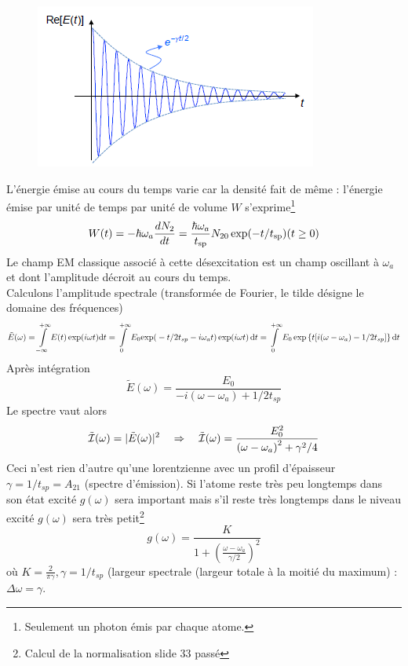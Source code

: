 	\newpage
		\begin{figure}
	\vspace{-5mm}
	\includegraphics[scale=0.75]{ch2/image17.png}
	\end{figure}
	L'énergie émise au cours du temps varie car la densité fait de même : l'énergie émise par 
	unité de temps par unité de volume $W$ s'exprime\footnote{Seulement un photon émis par chaque
	atome.}
	\begin{equation}
	W(t) =  - \hbar {\omega _a}\frac{{d{N_2}}}{{dt}} = \frac{{\hbar {\omega _a}}}{{{t_{{\rm{sp}}}}}}{N_{20}}\exp ( - t/{t_{{\rm{sp}}}}){\rm{ }}(t \ge 0)
	\end{equation}
	Le champ EM classique associé à cette désexcitation est un champ oscillant à $\omega_a$ et dont 
	l'amplitude décroit au cours du temps.\\

	Calculons l'amplitude spectrale (transformée de Fourier, le tilde désigne le domaine des 
	fréquences)
	\begin{equation}
	\tilde E(\omega ) = \int\limits_{ - \infty }^{ + \infty } {E(t)} \,{\rm{exp(}}i\omega t{\rm{)d}}t = \int\limits_0^{ + \infty } {{E_0}{\rm{exp(}} - t/2{t_{sp}} - i{\omega _a}t{\rm{)}}\,} {\rm{exp(}}i\omega t{\rm{)}}\,{\rm{d}}t{\rm{  }}  = \int\limits_0^{ + \infty } {{E_0}\exp \left\{ {t[i(\omega  - {\omega _a}) - 1/2{t_{sp}}]} \right\}{\rm{d}}t}
	\end{equation}
	Après intégration
	\begin{equation}
	\tilde E(\omega ) = \frac{{{E_0}}}{{ - i(\omega  - {\omega _a}) + 1/2{t_{sp}}}}
	\end{equation}
	Le spectre vaut alors
	\begin{equation}
	\tilde {\cal I}(\omega ) = |\tilde E(\omega ){|^2}\quad\Rightarrow\quad 
	\tilde {\cal I}(\omega ) = \frac{{E_0^2}}{{{{(\omega  - {\omega _a})}^2} + {\gamma ^2}/4}}
	\end{equation}
	Ceci n'est rien d'autre qu'une lorentzienne avec un profil d'épaisseur $\gamma = 1/t_{sp}=A_{21}$ 
	(spectre d'émission). Si l'atome reste très peu longtemps dans son état excité $g(\omega)$ sera 
	important mais s'il reste très longtemps dans le niveau excité $g(\omega)$ sera très 
	petit\footnote{Calcul de la normalisation slide 33 passé}
	\begin{equation}
	g(\omega ) = \frac{K}{{1 + {{(\frac{{\omega  - {\omega _a}}}{{\gamma /2}})}^2}}}
	\end{equation}
	où $K=\frac{2}{\pi\gamma}, \gamma=1/t_{sp}$ (largeur spectrale (largeur totale à la moitié 
	du maximum) : $\Delta\omega = \gamma$.
	

